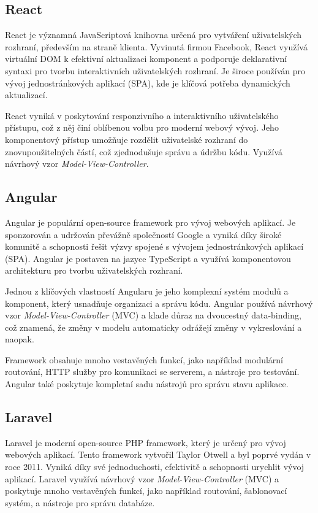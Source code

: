 \subsection{React}
\label{subsec:dev-framework-react}

React je významná JavaScriptová knihovna určená pro vytváření uživatelských rozhraní, především na straně klienta. Vyvinutá firmou Facebook, React využívá virtuální DOM k efektivní aktualizaci komponent a podporuje deklarativní syntaxi pro tvorbu interaktivních uživatelských rozhraní. Je široce používán pro vývoj jednostránkových aplikací (SPA), kde je klíčová potřeba dynamických aktualizací.

React vyniká v poskytování responzivního a interaktivního uživatelského přístupu, což z něj činí oblíbenou volbu pro moderní webový vývoj. Jeho komponentový přístup umožňuje rozdělit uživatelské rozhraní do znovupoužitelných částí, což zjednodušuje správu a údržbu kódu. Využívá návrhový vzor \textit{Model-View-Controller}. \cite{about_react}

\subsection{Angular}
\label{subsec:dev-framework-angular}
Angular je populární open-source framework pro vývoj webových aplikací. Je sponzorován a udržován převážně společností Google a vyniká díky široké komunitě a schopnosti řešit výzvy spojené s vývojem jednostránkových aplikací (SPA). Angular je postaven na jazyce TypeScript a využívá komponentovou architekturu pro tvorbu uživatelských rozhraní.

Jednou z klíčových vlastností Angularu je jeho komplexní systém modulů a komponent, který usnadňuje organizaci a správu kódu. Angular používá návrhový vzor \textit{Model-View-Controller} (MVC) a klade důraz na dvoucestný data-binding, což znamená, že změny v modelu automaticky odrážejí změny v vykreslování a naopak.

Framework obsahuje mnoho vestavěných funkcí, jako například modulární routování, HTTP služby pro komunikaci se serverem, a nástroje pro testování. Angular také poskytuje kompletní sadu nástrojů pro správu stavu aplikace. \cite{about_angular}

\subsection{Laravel}
\label{subsec:dev-framework-laravel}
Laravel je moderní open-source PHP framework, který je určený pro vývoj webových aplikací. Tento framework vytvořil Taylor Otwell a byl poprvé vydán v roce 2011. Vyniká díky své jednoduchosti, efektivitě a schopnosti urychlit vývoj aplikací. Laravel využívá návrhový vzor \textit{Model-View-Controller} (MVC) a poskytuje mnoho vestavěných funkcí, jako například routování, šablonovací systém, a nástroje pro správu databáze.

